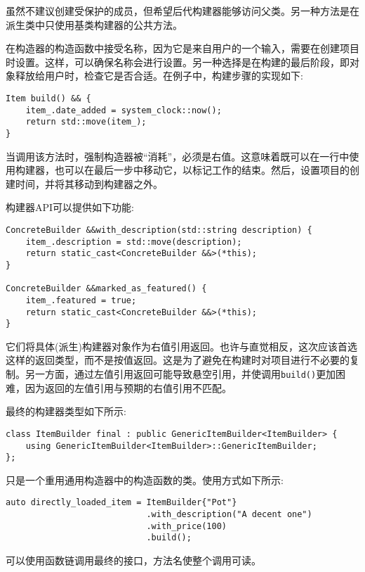 虽然不建议创建受保护的成员，但希望后代构建器能够访问父类。另一种方法是在派生类中只使用基类构建器的公共方法。

在构造器的构造函数中接受名称，因为它是来自用户的一个输入，需要在创建项目时设置。这样，可以确保名称会进行设置。另一种选择是在构建的最后阶段，即对象释放给用户时，检查它是否合适。在例子中，构建步骤的实现如下:

\begin{lstlisting}[style=styleCXX]
Item build() && {
	item_.date_added = system_clock::now();
	return std::move(item_);
}
\end{lstlisting}

当调用该方法时，强制构造器被“消耗”，必须是右值。这意味着既可以在一行中使用构建器，也可以在最后一步中移动它，以标记工作的结束。然后，设置项目的创建时间，并将其移动到构建器之外。

构建器API可以提供如下功能:

\begin{lstlisting}[style=styleCXX]
ConcreteBuilder &&with_description(std::string description) {
	item_.description = std::move(description);
	return static_cast<ConcreteBuilder &&>(*this);
}

ConcreteBuilder &&marked_as_featured() {
	item_.featured = true;
	return static_cast<ConcreteBuilder &&>(*this);
}
\end{lstlisting}

它们将具体(派生)构建器对象作为右值引用返回。也许与直觉相反，这次应该首选这样的返回类型，而不是按值返回。这是为了避免在构建时对项目进行不必要的复制。另一方面，通过左值引用返回可能导致悬空引用，并使调用\texttt{build()}更加困难，因为返回的左值引用与预期的右值引用不匹配。

最终的构建器类型如下所示:

\begin{lstlisting}[style=styleCXX]
class ItemBuilder final : public GenericItemBuilder<ItemBuilder> {
	using GenericItemBuilder<ItemBuilder>::GenericItemBuilder;
};
\end{lstlisting}

只是一个重用通用构造器中的构造函数的类。使用方式如下所示:

\begin{lstlisting}[style=styleCXX]
auto directly_loaded_item = ItemBuilder{"Pot"}
							.with_description("A decent one")
							.with_price(100)
							.build();
\end{lstlisting}

可以使用函数链调用最终的接口，方法名使整个调用可读。

